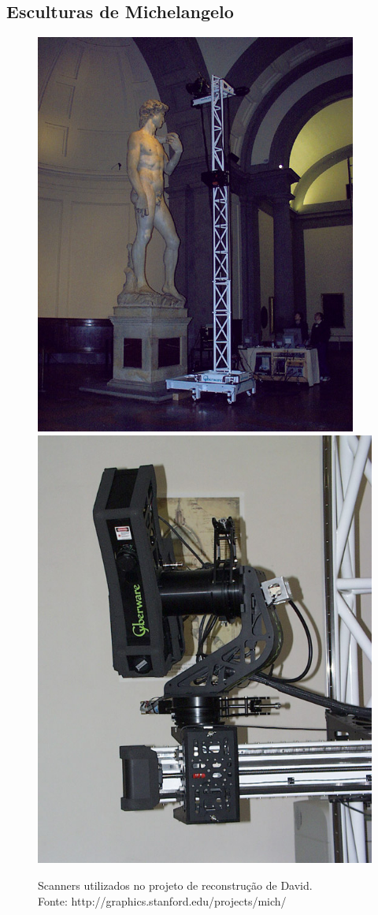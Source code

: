 \documentclass[table, usenames, svgnames, xcolor=dvipsnames]{beamer}
\begin{document}
\subsection{Esculturas de Michelangelo}

\begin{frame} 
	\begin{figure}[!h]
		\centering
		\includegraphics[width=0.4\linewidth]{figs/gantry-and-david4-s.jpg}
		\includegraphics[width=0.4\linewidth]{figs/mgantry-scannerhead-s.jpg}
		\caption{%
		Scanners utilizados no projeto de reconstrução de David. \\
		\tiny{Fonte: http://graphics.stanford.edu/projects/mich/}
		}
	\end{figure}
\end{frame}
\end{document}
